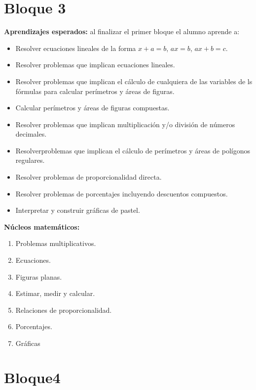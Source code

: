 \documentclass[11pt]{article}
\begin{document}
\section*{Bloque 3}

\textbf{Aprendizajes esperados:} al finalizar el primer bloque el alumno aprende a:

\begin{itemize}
\setlength\itemsep{-0.4em}
    \item Resolver ecuaciones lineales de la forma $x+a=b$, $ax=b$, $ax+b=c$.
    \item Resolver problemas que implican ecuaciones lineales.
    \item Resolver problemas que implican el c\'alculo de cualquiera de las
    variables de ls f\'ormulas para calcular per\'imetros y \'areas de figuras.
    \item Calcular per\'imetros y \'areas de figuras compuestas.
    \item Resolver problemas que implican multiplicaci\'on y/o divisi\'on de
    n\'umeros decimales.
    \item Resolverproblemas que implican el c\'alculo de per\'imetros y \'areas
    de pol\'igonos regulares.
    \item Resolver problemas de proporcionalidad directa.
    \item Resolver problemas de porcentajes incluyendo descuentos compuestos.
    \item Interpretar y construir gr\'aficas de pastel.
\end{itemize}

\textbf{N\'ucleos matem\'aticos:}

\begin{enumerate}
\setlength\itemsep{-0.4em}
    \item Problemas multiplicativos.
    \item Ecuaciones.
    \item Figuras planas.
    \item Estimar, medir y calcular.
    \item Relaciones de proporcionalidad.
    \item Porcentajes.
    \item Gr\'aficas

\end{enumerate}

\section*{Bloque4}
\end{document}
